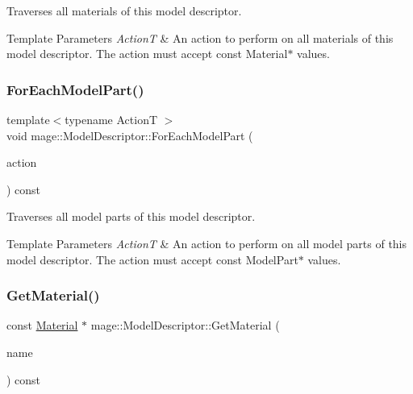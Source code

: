 Traverses all materials of this model descriptor.


\begin{DoxyTemplParams}{Template Parameters}
{\em ActionT} & An action to perform on all materials of this model descriptor. The action must accept {\ttfamily const} {\ttfamily Material$\ast$} values. \\
\hline
\end{DoxyTemplParams}
\hypertarget{classmage_1_1_model_descriptor_a1d61699788385cf29726fac0067bcb5c}{}\label{classmage_1_1_model_descriptor_a1d61699788385cf29726fac0067bcb5c} 
\subsubsection{\texorpdfstring{For\+Each\+Model\+Part()}{ForEachModelPart()}}
{\footnotesize\ttfamily template$<$typename ActionT $>$ \\
void mage\+::\+Model\+Descriptor\+::\+For\+Each\+Model\+Part (\begin{DoxyParamCaption}\item[{ActionT}]{action }\end{DoxyParamCaption}) const}

Traverses all model parts of this model descriptor.


\begin{DoxyTemplParams}{Template Parameters}
{\em ActionT} & An action to perform on all model parts of this model descriptor. The action must accept {\ttfamily const} {\ttfamily Model\+Part$\ast$} values. \\
\hline
\end{DoxyTemplParams}
\hypertarget{classmage_1_1_model_descriptor_adc013e6b054c7efa0d92a3ad1ff37e61}{}\label{classmage_1_1_model_descriptor_adc013e6b054c7efa0d92a3ad1ff37e61} 
\subsubsection{\texorpdfstring{Get\+Material()}{GetMaterial()}}
{\footnotesize\ttfamily const \hyperlink{classmage_1_1_material}{Material} $\ast$ mage\+::\+Model\+Descriptor\+::\+Get\+Material (\begin{DoxyParamCaption}\item[{const string \&}]{name }\end{DoxyParamCaption}) const\hspace{0.3cm}{\ttfamily [noexcept]}}

